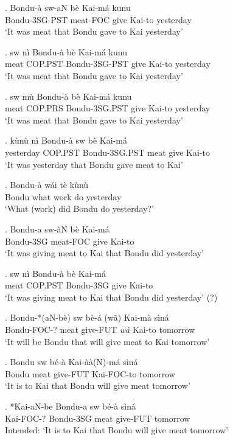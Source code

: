 \documentclass{assets/fieldnotes}
\begin{document}
\exg. Bondu-à sw-aN bè Kai-má kunu\\
Bondu-3SG-PST meat-FOC give Kai-to yesterday\\
`It was meat that Bondu gave to Kai yesterday'

\exg. sw nì Bondu-à bè Kai-má kunu\\
meat COP.PST Bondu-3SG-PST give Kai-to yesterday\\
`It was meat that Bondu gave to Kai yesterday'

\exg. sw mù Bondu-à bè Kai-má kunu\\
meat COP.PRS Bondu-3SG.PST give Kai-to yesterday\\
`It was meat that Bondu gave to Kai yesterday'

\exg. kùnù nì Bondu-à sw bè Kai-má\\
yesterday COP.PST Bondu-3SG.PST meat give Kai-to\\
`It was yesterday that Bondu gave meat to Kai'

\exg. Bondu-à  wái tè kùnù\\
Bondu what work do yesterday\\
`What (work) did Bondu do yesterday?'

\exg. Bondu-a sw-àN bè Kai-má\\
Bondu-3SG meat-FOC give Kai-to\\
`It was giving meat to Kai that Bondu did yesterday'

\exg. sw nì Bondu-à bè Kai-má\\
meat COP.PST Bondu-3SG give Kai-to\\
`It was giving meat to Kai that Bondu did yesterday' (?)

\exg. Bondu-*(aN-bè) sw bè-á (wã) Kai-mà sìná\\
Bondu-FOC-? meat give-FUT \textit{wã} Kai-to tomorrow\\
`It will be Bondu that will give meat to Kai tomorrow'

\exg. Bondu sw bé-à Kai-àà(N)-má sìná\\
Bondu meat give-FUT Kai-FOC-to tomorrow\\
`It is to Kai that Bondu will give meat tomorrow'

\exg. *Kai-aN-be Bondu-a sw bé-à sìná\\
Kai-FOC-? Bondu-3SG meat give-FUT tomorrow\\
Intended: `It is to Kai that Bondu will give meat tomorrow'
\end{document}
